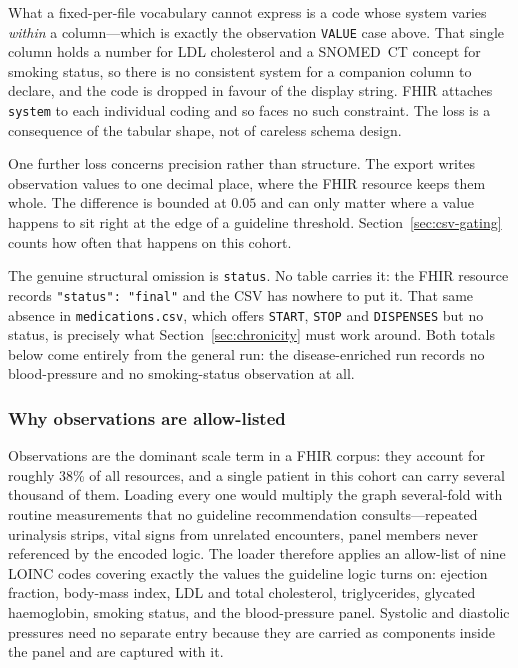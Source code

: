 What a fixed-per-file vocabulary cannot express is a code whose system varies \emph{within} a
column---which is exactly the observation \texttt{VALUE} case above. That single column holds a
number for LDL cholesterol and a SNOMED~CT concept for smoking status, so there is no
consistent system for a companion column to declare, and the code is dropped in favour of the
display string. FHIR attaches \texttt{system} to each individual coding and so faces no such
constraint. The loss is a consequence of the tabular shape, not of careless schema design.

One further loss concerns precision rather than structure. The export writes observation values
to one decimal place, where the FHIR resource keeps them whole. The difference is bounded at
$0.05$ and can only matter where a value happens to sit right at the edge of a guideline
threshold. Section~\ref{sec:csv-gating} counts how often that happens on this cohort.

The genuine structural omission is \texttt{status}. No table carries it: the FHIR resource records
\texttt{"status": "final"} and the CSV has nowhere to put it. That same absence in
\texttt{medications.csv}, which offers \texttt{START}, \texttt{STOP} and \texttt{DISPENSES} but
no status, is precisely what Section~\ref{sec:chronicity} must work around.
Both totals below come entirely from the general run: the disease-enriched run records no
blood-pressure and no smoking-status observation at all.

\subsubsection*{Why observations are allow-listed}
Observations are the dominant scale term in a FHIR corpus: they account for roughly
38\% of all resources, and a single patient in this cohort can carry several
thousand of them. Loading every one would multiply the graph several-fold with routine
measurements that no guideline recommendation consults---repeated urinalysis strips, vital
signs from unrelated encounters, panel members never referenced by the encoded logic. The
loader therefore applies an allow-list of nine LOINC codes covering exactly the
values the guideline logic turns on: ejection fraction, body-mass index, LDL and total
cholesterol, triglycerides, glycated haemoglobin, smoking status, and the blood-pressure
panel. Systolic and diastolic pressures need no separate entry because they are carried as
components inside the panel and are captured with it.

